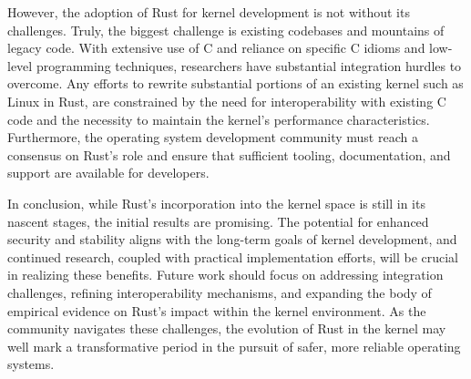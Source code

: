 \documentclass[sigconf]{acmart}
\begin{document}
However, the adoption of Rust for kernel development is not without its challenges. Truly, the
biggest challenge is existing codebases and mountains of legacy code. With extensive use of C and
reliance on specific C idioms and low-level programming techniques, researchers have substantial
integration hurdles to overcome. Any efforts to rewrite substantial portions of an existing kernel
such as Linux in Rust, are constrained by the need for interoperability with existing C code and the
necessity to maintain the kernel's performance characteristics. Furthermore, the operating system
development community must reach a consensus on Rust's role and ensure that sufficient tooling,
documentation, and support are available for developers.

In conclusion, while Rust's incorporation into the kernel space is still in its nascent stages, the
initial results are promising. The potential for enhanced security and stability aligns with the
long-term goals of kernel development, and continued research, coupled with practical implementation
efforts, will be crucial in realizing these benefits. Future work should focus on addressing
integration challenges, refining interoperability mechanisms, and expanding the body of empirical
evidence on Rust's impact within the kernel environment. As the community navigates these
challenges, the evolution of Rust in the kernel may well mark a transformative period in the pursuit
of safer, more reliable operating systems.



\end{document}
